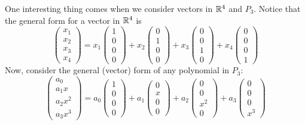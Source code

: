 One interesting thing comes when we consider vectors in $\mathbb R^4$ and $P_3$. Notice that the general form for a vector in $\mathbb R^{4}$ is 
\[
    \begin{pmatrix}
        x_1 \\ x_2 \\ x_3 \\ x_4
    \end{pmatrix}
    = 
    x_1 \begin{pmatrix}
        1 \\ 0 \\ 0 \\ 0
    \end{pmatrix}
    +
    x_2 \begin{pmatrix}
        0 \\ 1 \\ 0 \\ 0
    \end{pmatrix}
    + 
    x_3 \begin{pmatrix}
        0 \\ 0 \\ 1 \\ 0
    \end{pmatrix}
    +
    x_4 \begin{pmatrix}
        0 \\ 0 \\ 0 \\ 1
    \end{pmatrix}
\]
Now, consider the general (vector) form of any polynomial in $P_3$: 
\[
    \begin{pmatrix}
        a_0 \\ a_1x \\ a_2x^2 \\ a_3x^3
    \end{pmatrix}
    = 
    a_0 \begin{pmatrix}
        1 \\ 0 \\ 0 \\ 0
    \end{pmatrix}
    + 
    a_1 \begin{pmatrix}
        0 \\ x \\ 0 \\ 0
    \end{pmatrix}
    + 
    a_2 \begin{pmatrix}
        0 \\ 0 \\ x^2 \\ 0
    \end{pmatrix}
    + 
    a_3 \begin{pmatrix}
        0 \\ 0 \\ 0 \\ x^3
    \end{pmatrix}
\]
